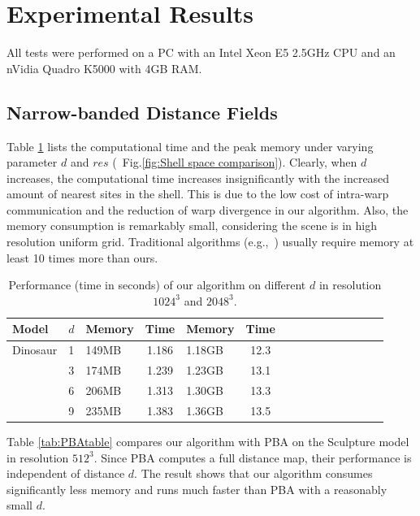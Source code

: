 \vspace{-0.4cm}

\section{Experimental Results}
\label{sec:results}
  All tests were performed on a PC with an Intel Xeon E5 2.5GHz CPU and an nVidia Quadro K5000 with 4GB RAM.

\vspace{-0.4cm}

\subsection{Narrow-banded Distance Fields}
\label{sec:results_DF}
  Table \ref{tab:DFtable} lists the computational time and the peak memory under varying parameter $d$ and $res$ (~Fig.\ref{fig:Shell space comparison}).
  Clearly, when $d$ increases,
  the computational time increases insignificantly with the increased amount of nearest sites in the shell.
  This is due to the low cost of intra-warp communication and the reduction of warp divergence in our algorithm.
  Also, the memory consumption is remarkably small, considering the scene is in high resolution uniform grid.
  Traditional algorithms (e.g.,~\cite{Cao:2010}) usually require memory at least 10 times more than ours.

\begin{table}[tbh]
\caption{Performance (time in seconds) of our algorithm on different $d$ in resolution $1024^3$ and $2048^3$.}
\begin{center}
\begin{tabular}{lclclcllclcllcl}
\hline
    Model & $d$ & Memory & Time & Memory & Time \\
 \hline
   Dinosaur  & 1  & 149MB  &   1.186 & 1.18GB & 12.3  \\
             & 3  & 174MB  &   1.239 & 1.23GB & 13.1\\
             & 6  & 206MB  &  1.313 & 1.30GB  & 13.3\\
             & 9  & 235MB  &  1.383 & 1.36GB & 13.5 \\

  \hline
\end{tabular}
\end{center}
\label{tab:DFtable}
\end{table}


  Table \ref{tab:PBAtable} compares our algorithm with PBA on the Sculpture model in resolution $512^3$.
  Since PBA computes a full distance map, their performance is independent of distance $d$.
  The result shows that our algorithm consumes significantly less memory and runs much faster than PBA with a reasonably small $d$.

